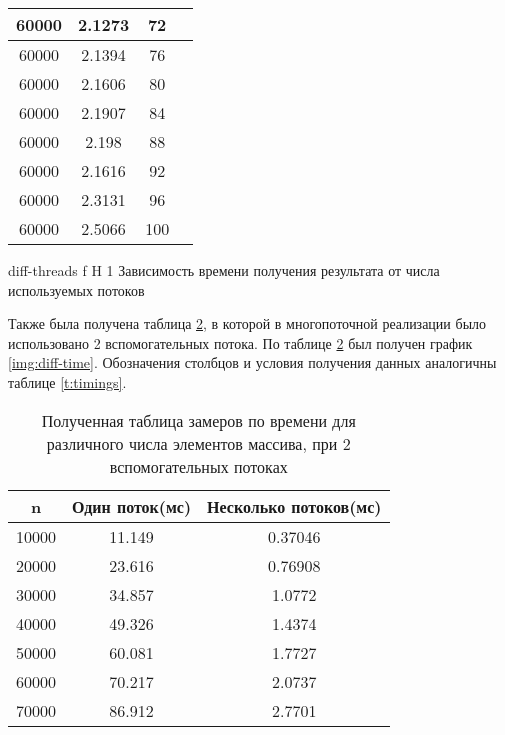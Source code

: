 \begin{table}[ht]
\begin{tabular}{|c|c|c|c|}
		60000 & 2.1273                            & 72            \\ \hline
		60000 & 2.1394                            & 76            \\ \hline
		60000 & 2.1606                            & 80            \\ \hline
		60000 & 2.1907                            & 84            \\ \hline
		60000 & 2.198                             & 88            \\ \hline
		60000 & 2.1616                            & 92            \\ \hline
		60000 & 2.3131                            & 96            \\ \hline
		60000 & 2.5066                            & 100           \\ \hline
	\end{tabular}
	\label{t:timings-threads}
\end{table}


{diff-threads} %
{f} %
{H} %
{1\textwidth} %
{Зависимость времени получения результата от числа используемых потоков} %


Также была получена таблица \ref{t:timings-n}, в которой в многопоточной реализации было использовано 2 вспомогательных потока. По таблице \ref{t:timings-n} был получен график \ref{img:diff-time}. 
Обозначения столбцов и условия получения данных аналогичны таблице \ref{t:timings}.
\begin{table}[!ht]
	\centering
	\caption{Полученная таблица замеров по времени для различного числа элементов массива, при 2 вспомогательных потоках}
	\begin{tabular}{|c|c|c|}
		\hline
		n     & Один поток(мс) & Несколько потоков(мс) \\ \hline
		10000 & 11.149                  & 0.37046                           \\ \hline
		20000 & 23.616                  & 0.76908                           \\ \hline
		30000 & 34.857                  & 1.0772                            \\ \hline
		40000 & 49.326                  & 1.4374                            \\ \hline
		50000 & 60.081                  & 1.7727                            \\ \hline
		60000 & 70.217                  & 2.0737                            \\ \hline
		70000 & 86.912                  & 2.7701                            \\ \hline
	\end{tabular}
	\label{t:timings-n}
\end{table}


